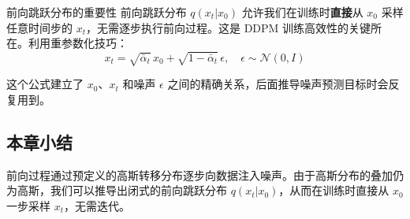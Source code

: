 \begin{importantbox}{前向跳跃分布的重要性}
前向跳跃分布 $q(x_t|x_0)$ 允许我们在训练时\textbf{直接}从 $x_0$ 采样任意时间步的 $x_t$，无需逐步执行前向过程。这是 DDPM 训练高效性的关键所在。利用重参数化技巧：
$$x_t = \sqrt{\bar{\alpha}_t}\, x_0 + \sqrt{1 - \bar{\alpha}_t}\, \epsilon, \quad \epsilon \sim \mathcal{N}(0, I)$$
\end{importantbox}

这个公式建立了 $x_0$、$x_t$ 和噪声 $\epsilon$ 之间的精确关系，后面推导噪声预测目标时会反复用到。

\subsection{本章小结}

前向过程通过预定义的高斯转移分布逐步向数据注入噪声。由于高斯分布的叠加仍为高斯，我们可以推导出闭式的前向跳跃分布 $q(x_t|x_0)$，从而在训练时直接从 $x_0$ 一步采样 $x_t$，无需迭代。


